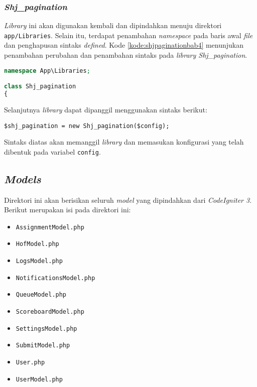 \subsubsection{\textit{Shj\_pagination}}
\textit{Library} ini akan digunakan kembali dan dipindahkan menuju direktori \texttt{app/Libraries}. Selain itu, terdapat penambahan \textit{namespace} pada baris awal \textit{file} dan penghapusan sintaks \textit{defined}. Kode \ref{kode:shjpaginationbab4} menunjukan penambahan perubahan dan penambahan sintaks pada \textit{library Shj\_pagination}.

\begin{lstlisting}[language=PHP, caption=Perancangan perubahan \textit{library Shj\_pagination} pada \textit{CodeIgniter 4}, label=kode:shjpaginationbab4]
namespace App\Libraries;

class Shj_pagination
{
\end{lstlisting}

Selanjutnya \textit{library} dapat dipanggil menggunakan sintaks berikut:

\begin{center}
\verb|$shj_pagination = new Shj_pagination($config);|
\end{center}

Sintaks diatas akan memanggil \textit{library} dan memasukan konfigurasi yang telah dibentuk pada variabel \texttt{config}.

\subsection{\textit{Models}}
Direktori ini akan berisikan seluruh \textit{model} yang dipindahkan dari \textit{CodeIgniter 3}. Berikut merupakan isi pada direktori ini:
\begin{itemize}
	\item \texttt{AssignmentModel.php}
	\item \texttt{HofModel.php}
	\item \texttt{LogsModel.php}
	\item \texttt{NotificationsModel.php}
	\item \texttt{QueueModel.php}
	\item \texttt{ScoreboardModel.php}
	\item \texttt{SettingsModel.php}
	\item \texttt{SubmitModel.php}
	\item \texttt{User.php}
	\item \texttt{UserModel.php}
\end{itemize}

